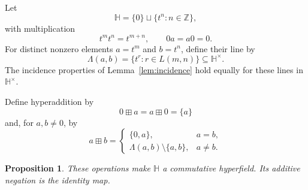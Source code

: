 \documentclass[11pt]{article}
\newcommand{\ZZ}{\mathbb{Z}}
\newcommand{\HH}{\mathbb{H}}
\newtheorem{proposition}[theorem]{Proposition}
\begin{document}
Let
\[
    \HH=\{0\}\sqcup\{t^n:n\in\ZZ\},
\]
with multiplication
\[
    t^m t^n=t^{m+n},\qquad 0a=a0=0.
\]
For distinct nonzero elements \(a=t^m\) and \(b=t^n\), define their line by
\[
    \Lambda(a,b)=\{t^r:r\in L(m,n)\}\subseteq\HH^\times.
\]
The incidence properties of Lemma~\ref{lem:incidence} hold equally for these
lines in \(\HH^\times\).

Define hyperaddition by
\[
    0\boxplus a=a\boxplus 0=\{a\}
\]
and, for \(a,b\neq 0\), by
\begin{equation}\label{eq:addition}
    a\boxplus b=
    \begin{cases}
        \{0,a\},&a=b,\\[2mm]
        \Lambda(a,b)\setminus\{a,b\},&a\neq b.
    \end{cases}
\end{equation}

\begin{proposition}\label{prop:hyperfield}
These operations make \(\HH\) a commutative hyperfield. Its additive
negation is the identity map.
\end{proposition}
\end{document}
